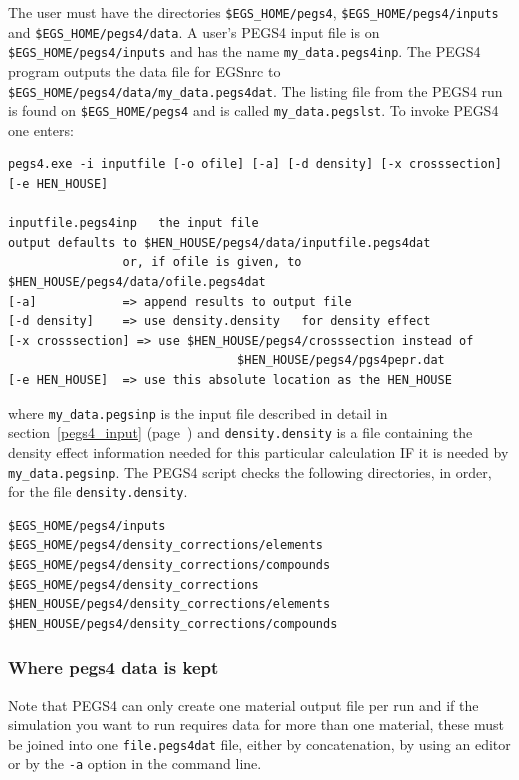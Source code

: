 The user must have the directories {\tt \$EGS\_HOME/pegs4},
{\tt \$EGS\_HOME/pegs4/inputs} and {\tt \$EGS\_HOME/pegs4/data}.
A user's PEGS4 input file is on {\tt \$EGS\_HOME/pegs4/inputs}
and has the name \verb+my_data.pegs4inp+.  The PEGS4 program outputs the
data file for EGSnrc to
\verb+$EGS_HOME/pegs4/data/my_data.pegs4dat+.
The listing file from the PEGS4
run is found on \verb+$EGS_HOME/pegs4+ and is called \verb+my_data.pegslst+.
To invoke PEGS4 one enters:
\begin{verbatim}
pegs4.exe -i inputfile [-o ofile] [-a] [-d density] [-x crosssection] [-e HEN_HOUSE]

inputfile.pegs4inp   the input file
output defaults to $HEN_HOUSE/pegs4/data/inputfile.pegs4dat
                or, if ofile is given, to $HEN_HOUSE/pegs4/data/ofile.pegs4dat
[-a]            => append results to output file
[-d density]    => use density.density   for density effect
[-x crosssection] => use $HEN_HOUSE/pegs4/crosssection instead of
                                $HEN_HOUSE/pegs4/pgs4pepr.dat
[-e HEN_HOUSE]  => use this absolute location as the HEN_HOUSE
\end{verbatim}
where \verb+my_data.pegsinp+ is the input file described in detail in
section~\ref{pegs4_input} (page~\pageref{pegs4_input}) and
\verb+density.density+
is a file containing the density effect information needed for this
particular calculation IF it is needed by \verb+my_data.pegsinp+.
The PEGS4 script checks the following directories, in order, for
the file \verb+density.density+.
\begin{verbatim}
$EGS_HOME/pegs4/inputs
$EGS_HOME/pegs4/density_corrections/elements
$EGS_HOME/pegs4/density_corrections/compounds
$EGS_HOME/pegs4/density_corrections
$HEN_HOUSE/pegs4/density_corrections/elements
$HEN_HOUSE/pegs4/density_corrections/compounds
\end{verbatim}

\subsubsection{Where pegs4 data is kept}
\label{wpdk}

Note that PEGS4 can only create one material output file per run and
if the simulation you want to run requires data for more than one material,
these must be joined into one \verb+file.pegs4dat+ file, either by
concatenation, by using an editor or by the {\tt -a} option in the command
line.

